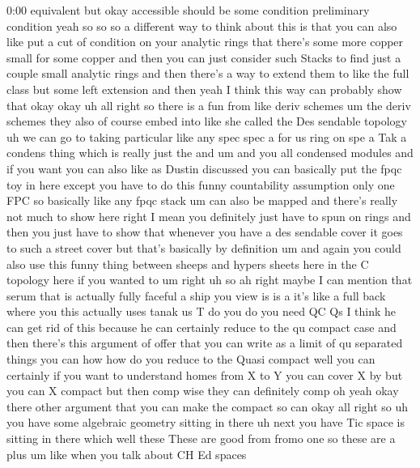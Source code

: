 \begin{unfinished}{0:00}
equivalent  but  okay  accessible  should  be
some  condition  preliminary  condition
yeah  so  so  so  a  different  way  to  think
about  this  is  that  you  can  also  like  put
a  cut  of  condition  on  your  analytic
rings  that  there's  some  more  copper
small  for  some
copper  and  then  you  can  just  consider
such  Stacks  to  find  just  a  couple  small
analytic
rings  and
then  there's  a  way  to  extend  them  to
like  the  full  class  but  some  left
extension  and  then  yeah  I  think
this  way  can  probably  show  that  okay
okay
uh  all
right  so  there  is  a
fun  from  like  deriv
schemes  um  the  deriv  schemes  they  also
of  course  embed  into  like  she  called  the
Des  sendable
topology  uh
we  can  go
to  taking  particular  like  any  spec  spec
a  for  us  ring  on  spe
a  Tak  a  condens  thing  which  is  really
just  the  and  um  and  you  all  condensed
modules  and  if  you  want  you  can  also
like  as  Dustin  discussed  you  can
basically  put  the  fpqc  toy  in  here
except  you  have  to  do  this  funny
countability
assumption  only  one
FPC
so  basically  like  any  fpqc
stack  um  can  also  be
mapped  and  there's  really  not  much  to
show  here  right  I  mean  you  definitely
just  have  to  spun  on  rings  and  then  you
just  have  to  show  that  whenever  you  have
a  des  sendable
cover  it  goes  to  such  a  street  cover  but
that's  basically  by
definition  um  and  again  you  could  also
use  this
funny  thing
between  sheeps  and  hypers  sheets  here  in
the  C  topology  here  if  you  wanted
to
um  right  uh
so  ah  right  maybe  I  can  mention  that
serum  that  is  actually  fully
faceful  a  ship  you  view  is  is
a  it's  like  a  full  back  where
you  this  actually  uses  tanak  us
T  do  you  do  you  need  QC
Qs  I  think  he  can  get  rid  of  this
because  he  can  certainly  reduce  to  the
qu  compact  case  and  then  there's  this
argument  of  offer  that  you  can  write  as
a  limit  of  qu  separated  things  you  can
how  how  do  you  reduce  to  the  Quasi
compact  well  you  can  certainly  if  you
want  to  understand  homes  from  X  to  Y  you
can  cover  X  by  but  you  can  X  compact  but
then  comp  wise  they  can  definitely  comp
oh  yeah  okay  there  other  argument  that
you  can  make  the  compact  so
can
okay
all  right  so  uh  you  have  some  algebraic
geometry  sitting  in
there  uh  next  you
have  Tic  space  is  sitting  in
there
which  well  these  These  are  good  from
fromo  one  so  these
are  a  plus
um  like  when  you  talk  about  CH  Ed  spaces

\end{unfinished}
